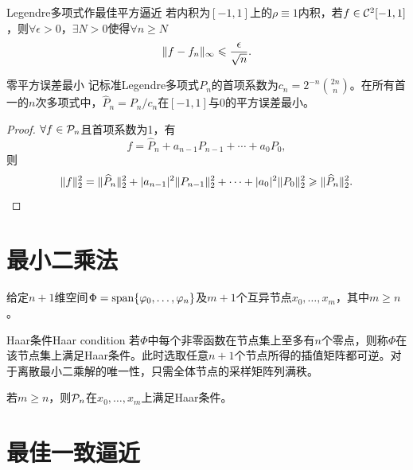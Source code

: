 
\begin{theorem}
    {Legendre多项式作最佳平方逼近}{}
    若内积为$[-1,1]$上的$\rho \equiv 1$内积，若$f \in \mathcal{C}^2[-1,1]$，则$\forall\epsilon > 0$，$\exists N > 0$使得$\forall n \geq N$
    \begin{equation}
        \lVert f - f_n\rVert_\infty \leqslant \frac{\epsilon}{\sqrt n}.
    \end{equation}
\end{theorem}

\begin{theorem}
    {零平方误差最小}{}
    记标准Legendre多项式$P_n$的首项系数为$c_n = 2^{-n}\binom{2n}{n}$。在所有首一的$n$次多项式中，$\widehat P_n = P_n/c_n$在$[-1,1]$与0的平方误差最小。
\end{theorem}

\begin{proof}
    $\forall f \in \mathcal{P}_n$且首项系数为1，有
    \[
        f = \widehat P_n + a_{n-1}P_{n-1} + \cdots + a_0P_0,
    \]
    则
    \[
        \lVert f\rVert_2^2 = \lVert\widehat P_n\rVert_2^2 + \lvert a_{n-1}\rvert^2\lVert P_{n-1}\rVert_2^2 + \cdots + \lvert a_0\rvert^2\lVert P_0\rVert_2^2 \geqslant \lVert\widehat P_n\rVert_2^2.
        \qedhere
    \]
\end{proof}

\section{最小二乘法}
\label{sec:least squares algorithm}

给定$n + 1$维空间$\Phi = \operatorname{span}\{\varphi_0,\ldots,\varphi_n\}$及$m + 1$个互异节点$x_0,\ldots,x_m$，其中$m \geq n$。

\begin{definition}
    {Haar条件}{Haar condition}
    若$\Phi$中每个非零函数在节点集上至多有$n$个零点，则称$\Phi$在该节点集上满足Haar条件。此时选取任意$n + 1$个节点所得的插值矩阵都可逆。对于离散最小二乘解的唯一性，只需全体节点的采样矩阵列满秩。
\end{definition}

\begin{example}
    {}{}
    若$m \geq n$，则$\mathcal{P}_n$在$x_0,\ldots,x_m$上满足Haar条件。
\end{example}

\section{最佳一致逼近}
\label{sec:optimal uniform approximation}

